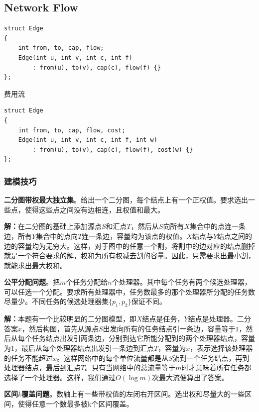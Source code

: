 \documentclass[twoside]{article}
\begin{document}
\subsection{Network Flow}
\begin{lstlisting}
struct Edge
{
    int from, to, cap, flow;
    Edge(int u, int v, int c, int f)
        : from(u), to(v), cap(c), flow(f) {}
};
\end{lstlisting}
费用流
\begin{lstlisting}
struct Edge
{
    int from, to, cap, flow, cost;
    Edge(int u, int v, int c, int f, int w)
        : from(u), to(v), cap(c), flow(f), cost(w) {}
};
\end{lstlisting}
\subsubsection*{建模技巧}


\indent

\textbf{二分图带权最大独立集}。给出一个二分图，每个结点上有一个正权值。要求选出一些点，使得这些点之间没有边相连，且权值和最大。

\indent

\textbf{解：}在二分图的基础上添加源点$S$和汇点$T$，然后从$S$向所有$X$集合中的点连一条边，所有$Y$集合中的点向$T$连一条边，容量均为该点的权值。$X$结点与$Y$结点之间的边的容量均为无穷大。这样，对于图中的任意一个割，将割中的边对应的结点删掉就是一个符合要求的解，权和为所有权减去割的容量。因此，只需要求出最小割，就能求出最大权和。

\indent

\textbf{公平分配问题}。把$m$个任务分配给$n$个处理器。其中每个任务有两个候选处理器，可以任选一个分配。要求所有处理器中，任务数最多的那个处理器所分配的任务数尽量少。不同任务的候选处理器集$\lbrace p_1 , p_2 \rbrace$保证不同。

\indent

\textbf{解：}本题有一个比较明显的二分图模型，即$X$结点是任务，$Y$结点是处理器。二分答案$x$，然后构图，首先从源点$S$出发向所有的任务结点引一条边，容量等于$1$，然后从每个任务结点出发引两条边，分别到达它所能分配到的两个处理器结点，容量为$1$，最后从每个处理器结点出发引一条边到汇点$T$，容量为$x$，表示选择该处理器的任务不能超过$x$。这样网络中的每个单位流量都是从$S$流到一个任务结点，再到处理器结点，最后到汇点$T$。只有当网络中的总流量等于$m$时才意味着所有任务都选择了一个处理器。这样，我们通过$O(\log m)$次最大流便算出了答案。

\indent

\textbf{区间$k$覆盖问题}。数轴上有一些带权值的左闭右开区间。选出权和尽量大的一些区间，使得任意一个数最多被k个区间覆盖。
\end{document}
